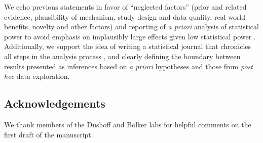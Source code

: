 We echo previous statements in favor of ``neglected factors'' (prior and related evidence, plausibility of mechanism, study design and data quality, real world benefits, novelty and other factors) \citep{McShaneetal.2017} and reporting of \emph{a priori} analysis of statistical power to avoid emphasis on implausibly large effects given low statistical power \citep[the ``winner's curse''][]{GelmanandCarlin2014, SzucsandIoannidis2017, Bernardietal.2017}.  Additionally, we support the idea of writing a statistical journal that chronicles all steps in the analysis process \citep{Kassetal.2016}, and clearly defining the boundary between results presented as inferences based on \emph{a priori} hypotheses and those from \emph{post hoc} data exploration.

\subsection*{Acknowledgements}

We thank members of the Dushoff and Bolker labs for helpful comments on the first draft of the manuscript.


